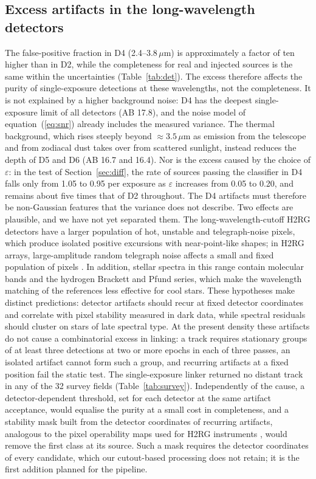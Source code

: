\documentclass[twocolumn,linenumbers,anonymous]{aastex702}
\begin{document}
\subsection{Excess artifacts in the long-wavelength detectors}\label{sec:d4}
The false-positive fraction in D4 (2.4--3.8\,$\mu$m) is approximately a factor of ten higher than in D2, while the completeness for real and injected sources is the same within the uncertainties (Table~\ref{tab:det}). The excess therefore affects the purity of single-exposure detections at these wavelengths, not the completeness. It is not explained by a higher background noise: D4 has the deepest single-exposure limit of all detectors (AB 17.8), and the noise model of equation~(\ref{eq:snr}) already includes the measured variance. The thermal background, which rises steeply beyond $\approx 3.5\,\mu$m as emission from the telescope and from zodiacal dust \citep{kelsall98} takes over from scattered sunlight, instead reduces the depth of D5 and D6 (AB 16.7 and 16.4). Nor is the excess caused by the choice of $\varepsilon$: in the test of Section~\ref{sec:diff}, the rate of sources passing the classifier in D4 falls only from 1.05 to 0.95 per exposure as $\varepsilon$ increases from 0.05 to 0.20, and remains about five times that of D2 throughout. The D4 artifacts must therefore be non-Gaussian features that the variance does not describe. Two effects are plausible, and we have not yet separated them. The long-wavelength-cutoff H2RG detectors have a larger population of hot, unstable and telegraph-noise pixels, which produce isolated positive excursions with near-point-like shapes; in H2RG arrays, large-amplitude random telegraph noise affects a small and fixed population of pixels \citep{rauscher07,kohley18}. In addition, stellar spectra in this range contain molecular bands and the hydrogen Brackett and Pfund series, which make the wavelength matching of the references less effective for cool stars. These hypotheses make distinct predictions: detector artifacts should recur at fixed detector coordinates and correlate with pixel stability measured in dark data, while spectral residuals should cluster on stars of late spectral type. At the present density these artifacts do not cause a combinatorial excess in linking: a track requires stationary groups of at least three detections at two or more epochs in each of three passes, an isolated artifact cannot form such a group, and recurring artifacts at a fixed position fail the static test. The single-exposure linker returned no distant track in any of the 32 survey fields (Table~\ref{tab:survey}). Independently of the cause, a detector-dependent threshold, set for each detector at the same artifact acceptance, would equalise the purity at a small cost in completeness, and a stability mask built from the detector coordinates of recurring artifacts, analogous to the pixel operability maps used for H2RG instruments \citep{rauscher07}, would remove the first class at its source. Such a mask requires the detector coordinates of every candidate, which our cutout-based processing does not retain; it is the first addition planned for the pipeline.
\end{document}
